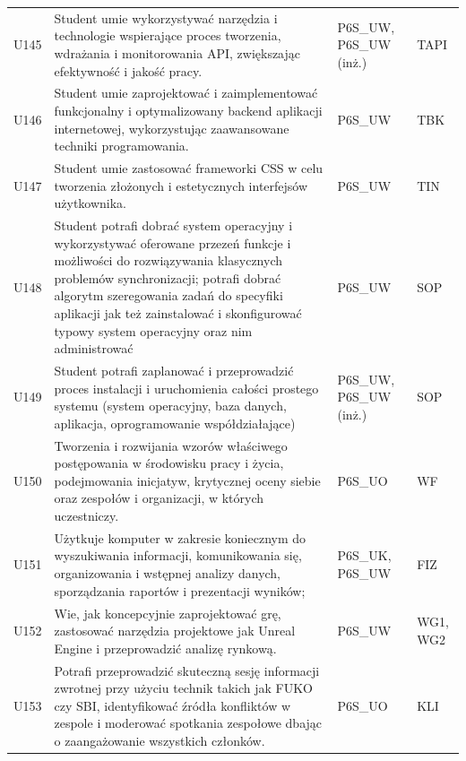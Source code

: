 \documentclass[12pt,a4paper]{article}
\begin{document}
{\begin{longtable}{m{1cm}m{8.8cm}m{2.1cm}m{2.5cm}}
\rowcolor{tableRowLight} U145 & Student umie wykorzystywać narzędzia i technologie wspierające proces tworzenia, wdrażania i monitorowania API, zwiększając efektywność i jakość pracy. & {\scriptsize P6S\_UW, P6S\_UW {\scriptsize (inż.)}} & {\scriptsize TAPI} \\
\rowcolor{tableRowAlt} U146 & Student umie zaprojektować i zaimplementować funkcjonalny i optymalizowany backend aplikacji internetowej, wykorzystując zaawansowane techniki programowania. & {\scriptsize P6S\_UW} & {\scriptsize TBK} \\
\rowcolor{tableRowLight} U147 & Student umie zastosować frameworki CSS w celu tworzenia złożonych i estetycznych interfejsów użytkownika. & {\scriptsize P6S\_UW} & {\scriptsize TIN} \\
\rowcolor{tableRowAlt} U148 & Student potrafi dobrać system operacyjny i wykorzystywać oferowane przezeń funkcje i możliwości do rozwiązywania klasycznych problemów synchronizacji; potrafi dobrać algorytm szeregowania zadań do specyfiki aplikacji jak też zainstalować i skonfigurować typowy system operacyjny oraz nim administrować & {\scriptsize P6S\_UW} & {\scriptsize SOP} \\
\rowcolor{tableRowLight} U149 & Student potrafi zaplanować i przeprowadzić proces instalacji i uruchomienia całości prostego systemu (system operacyjny, baza danych, aplikacja, oprogramowanie współdziałające) & {\scriptsize P6S\_UW, P6S\_UW {\scriptsize (inż.)}} & {\scriptsize SOP} \\
\rowcolor{tableRowAlt} U150 & Tworzenia i rozwijania wzorów właściwego postępowania w środowisku pracy i życia, podejmowania inicjatyw, krytycznej oceny siebie oraz zespołów i organizacji, w których uczestniczy. & {\scriptsize P6S\_UO} & {\scriptsize WF} \\
\rowcolor{tableRowLight} U151 & Użytkuje komputer w zakresie koniecznym do wyszukiwania informacji, komunikowania się, organizowania i wstępnej analizy danych, sporządzania raportów i prezentacji wyników; & {\scriptsize P6S\_UK, P6S\_UW} & {\scriptsize FIZ} \\
\rowcolor{tableRowAlt} U152 & Wie, jak koncepcyjnie zaprojektować grę, zastosować narzędzia projektowe jak Unreal Engine i przeprowadzić analizę rynkową. & {\scriptsize P6S\_UW} & {\scriptsize WG1, WG2} \\
\rowcolor{tableRowLight} U153 & Potrafi przeprowadzić skuteczną sesję informacji zwrotnej przy użyciu technik takich jak FUKO czy SBI, identyfikować źródła konfliktów w zespole i moderować spotkania zespołowe dbając o zaangażowanie wszystkich członków. & {\scriptsize P6S\_UO} & {\scriptsize KLI} \\

\end{longtable}}
\end{document}
